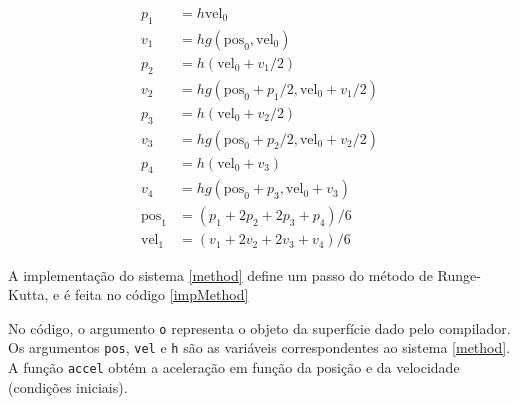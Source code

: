 \begin{equation}
\label{method}
\begin{split}
    p_1 & = h\text{vel}_0 \\
    v_1 & = hg(\text{pos}_0, \text{vel}_0) \\
    p_2 & = h(\text{vel}_0+v_1/2) \\
    v_2 & = hg(\text{pos}_0+p_1/2, \text{vel}_0+v_1/2) \\
    p_3 & = h(\text{vel}_0+v_2/2) \\
    v_3 & = hg(\text{pos}_0+p_2/2, \text{vel}_0+v_2/2) \\
    p_4 & = h(\text{vel}_0+v_3) \\
    v_4 & = hg(\text{pos}_0+p_3, \text{vel}_0+v_3) \\
    \text{pos}_1 & = (p_1+2p_2+2p_3+p_4)/6 \\
    \text{vel}_1 & = (v_1+2v_2+2v_3+v_4)/6
\end{split}
\end{equation}

A implementação do sistema \ref{method} define um passo do método de Runge-Kutta,
e é feita no código \ref{impMethod}


No código, o argumento \texttt{o} representa o objeto da superfície dado pelo compilador.
Os argumentos \texttt{pos}, \texttt{vel} e \texttt{h} são as variáveis correspondentes ao sistema \ref{method}.
A função \texttt{accel} obtém a aceleração em função da posição e da velocidade
(condições iniciais).
